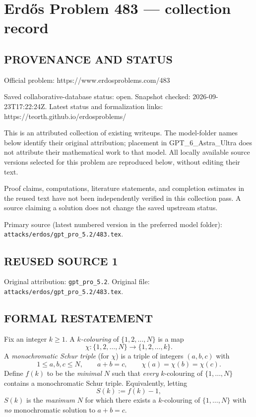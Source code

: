 \section*{Erd\H{o}s Problem 483 --- collection record}

\subsection*{PROVENANCE AND STATUS}
Official problem: https://www.erdosproblems.com/483

Saved collaborative-database status: open.
Snapshot checked: 2026-09-23T17:22:24Z.
Latest status and formalization links: https://teorth.github.io/erdosproblems/

This is an attributed collection of existing writeups. The model-folder names below identify their original attribution; placement in GPT\_6\_Astra\_Ultra does not attribute their mathematical work to that model. All locally available source versions selected for this problem are reproduced below, without editing their text.

Proof claims, computations, literature statements, and completion estimates in the reused text have not been independently verified in this collection pass. A source claiming a solution does not change the saved upstream status.

Primary source (latest numbered version in the preferred model folder): \texttt{attacks/erdos/gpt\_pro\_5.2/483.tex}.

\subsection*{REUSED SOURCE 1}
Original attribution: \texttt{gpt\_pro\_5.2}.
Original file: \texttt{attacks/erdos/gpt\_pro\_5.2/483.tex}.


\subsection*{FORMAL RESTATEMENT}
Fix an integer $k\ge 1$. A \emph{$k$-colouring} of $\{1,2,\dots,N\}$ is a map
\[\chi:\{1,2,\dots,N\}\to\{1,2,\dots,k\}.\]
A \emph{monochromatic Schur triple} (for $\chi$) is a triple of integers $(a,b,c)$ with
\[1\le a,b,c\le N,\qquad a+b=c,\qquad \chi(a)=\chi(b)=\chi(c).\]
Define $f(k)$ to be the \emph{minimal} $N$ such that \emph{every} $k$-colouring of $\{1,\dots,N\}$ contains a monochromatic Schur triple.
Equivalently, letting
\[S(k):=f(k)-1,\]
$S(k)$ is the \emph{maximum} $N$ for which there exists a $k$-colouring of $\{1,\dots,N\}$ with \emph{no} monochromatic solution to $a+b=c$.

